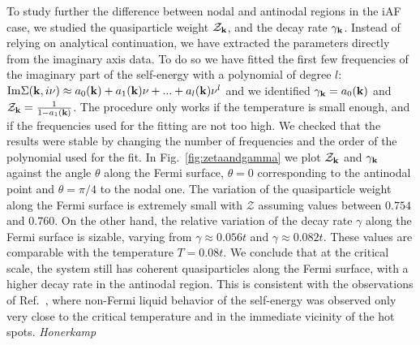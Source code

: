 To study further the difference between nodal and antinodal regions in the iAF case, we studied the quasiparticle weight\cite{Abrikosov1963,Metzner2012} $\mathcal{Z}_{\mathbf{k}}$, and the decay rate $\gamma_{\mathbf{k}}$.
Instead of relying on analytical continuation, we have extracted the parameters directly from the imaginary axis data.
To do so we have fitted the first few frequencies of the imaginary part of the self-energy with a polynomial of degree $l$: $\mathrm{Im}\Sigma(\mathbf{k},i\nu)\approx a_0(\mathbf{k})+a_1(\mathbf{k})\nu+...+a_l(\mathbf{k})\nu^l$ and we identified $\gamma_{\mathbf{k}}=a_0(\mathbf{k})$ and $\mathcal{Z}_{\mathbf{k}}= \frac{1}{1-a_1(\mathbf{k})}$.
The procedure only works if the temperature is small enough, and if the frequencies used for the fitting are not too high. We checked that the results were stable by changing the number of frequencies and the order of the polynomial used for the fit. 
In Fig.~\ref{fig:zetaandgamma} we plot $\mathcal{Z}_{\mathbf{k}}$ and $\gamma_{\mathbf{k}}$ against the angle $\theta$ along the Fermi surface, $\theta=0$ corresponding to the antinodal point and $\theta=\pi/4$ to the nodal one. 
The variation of the quasiparticle weight along the Fermi surface is extremely small with $\mathcal{Z}$ assuming values between $0.754$ and $0.760$. 
On the other hand, the relative variation of the decay rate $\gamma$ along the Fermi surface is sizable, varying from $\gamma\approx 0.056t$ and $\gamma \approx 0.082t$. These values are comparable with the temperature $T=0.08t$. 
We conclude that at the critical scale, the system still has coherent quasiparticles along the Fermi surface, with a higher decay rate in the antinodal region. This is consistent with the observations of Ref.~\cite{Rohe2005}, where non-Fermi liquid behavior of the self-energy was observed only very close to the critical temperature and in the immediate vicinity of the hot spots. \emph{Honerkamp}  

